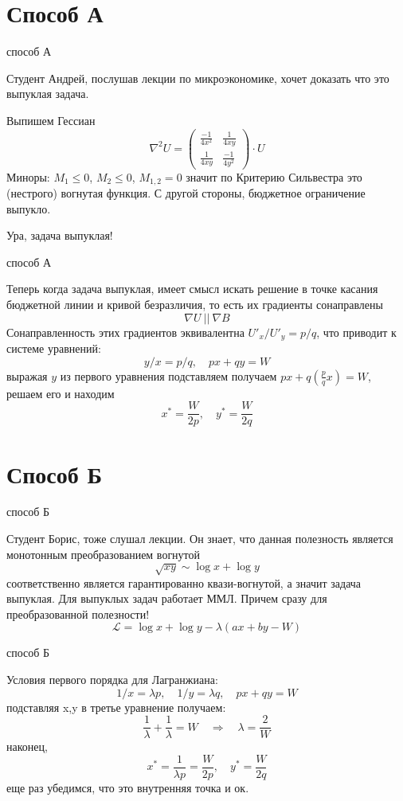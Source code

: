 \documentclass{beamer}
\begin{document}
\section{Способ А}

\begin{frame}{способ А}

Студент Андрей, послушав лекции по микроэкономике, хочет доказать что это выпуклая задача.

Выпишем Гессиан
$$ \nabla^2 U = \begin{pmatrix}
  \frac{-1}{4x^2}& \frac{1}{4xy}\\
  \frac{1}{4xy} & \frac{-1}{4y^2}
\end{pmatrix}\cdot U
$$
Миноры: $M_1 \leqslant 0$, $M_2 \leqslant 0$, $M_{1,2} = 0$ значит по  Критерию Сильвестра это (нестрого) вогнутая функция. С другой стороны, бюджетное ограничение выпукло. 

Ура, задача выпуклая!

\end{frame}

\begin{frame}{способ А}

Теперь когда задача выпуклая, имеет смысл искать решение в точке касания бюджетной линии и кривой безразличия, то есть их градиенты сонаправлены
$$ \nabla U \ || \ \nabla B$$
Сонаправленность этих градиентов эквивалентна $U'_x/U'_y = p/q$, что приводит к системе уравнений: $$ y/x = p/q, \quad px+qy = W$$
выражая $y$ из первого уравнения подставляем получаем $p x + q(\frac{p}{q}x) = W$, решаем его и находим $$x^* = \frac{W}{2p}, \quad y^* = \frac{W}{2q}$$
\end{frame}

\section{Способ Б}

\begin{frame}{способ Б}

Студент Борис, тоже слушал лекции. Он знает, что данная полезность является монотонным преобразованием вогнутой
$$ \sqrt{xy} \sim \log x + \log y$$
соответственно является гарантированно квази-вогнутой, а значит задача выпуклая. Для выпуклых задач работает ММЛ. Причем сразу для преобразованной полезности!
$$ \mathcal{L} = \log x + \log y - \lambda (ax + by - W)$$

\end{frame}

\begin{frame}{способ Б}

Условия первого порядка для Лагранжиана:
$$ 1/x = \lambda p, \quad 1/y = \lambda q, \quad px + qy = W$$
подставляя x,y в третье уравнение получаем:
$$ \frac{1}{\lambda} + \frac{1}{\lambda} = W \quad \Rightarrow \quad \lambda = \frac{2}{W}$$
наконец,
$$ x^*  = \frac{1}{\lambda p} = \frac{W}{2p}, \quad y^* = \frac{W}{2q}$$
еще раз убедимся, что это внутренняя точка и ок.
\end{frame}
\end{document}
